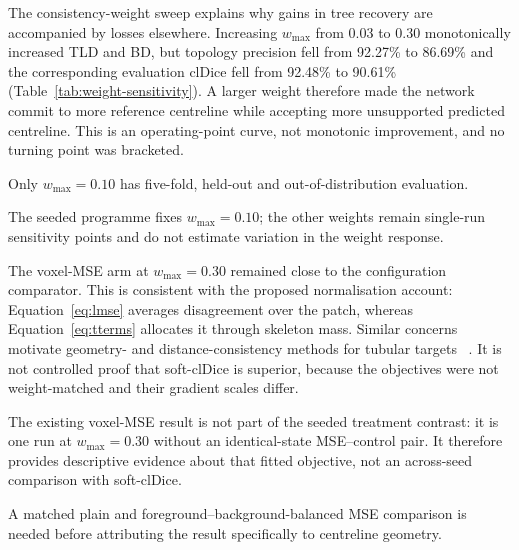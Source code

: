The consistency-weight sweep explains why gains in tree recovery are accompanied by losses
elsewhere. Increasing $w_{\max}$ from 0.03 to 0.30 monotonically increased TLD and BD, but topology
precision fell from 92.27\% to 86.69\% and the corresponding evaluation clDice fell from 92.48\%
to 90.61\% (Table~\ref{tab:weight-sensitivity}). A larger weight therefore made the network commit
to more reference centreline while accepting more unsupported predicted centreline. This is an
operating-point curve, not monotonic improvement, and no turning point was bracketed.

\ifshowcurrentcontrol
\begin{currentcontrolroute}
Only $w_{\max}=0.10$ has five-fold, held-out and out-of-distribution evaluation.
\end{currentcontrolroute}
\fi

\ifshowpairedcontrol
\begin{pairedcontrolroute}
The seeded programme fixes $w_{\max}=0.10$; the other weights remain single-run sensitivity
points and do not estimate variation in the weight response.
\end{pairedcontrolroute}
\fi

\ifshowcurrentcontrol
\begin{currentcontrolroute}
The voxel-MSE arm at $w_{\max}=0.30$ remained close to the configuration comparator. This is
consistent with the proposed normalisation account: Equation~\eqref{eq:lmse} averages disagreement
over the patch, whereas Equation~\eqref{eq:tterms} allocates it through skeleton mass. Similar
concerns motivate geometry- and distance-consistency methods for tubular targets
~\cite{gu2023featurespecialisation,zhu2024crossgeometry,zhao2025vesselselftraining}. It is not
controlled proof that soft-clDice is superior, because the objectives were not weight-matched and
their gradient scales differ.
\end{currentcontrolroute}
\fi

\ifshowpairedcontrol
\begin{pairedcontrolroute}
The existing voxel-MSE result is not part of the seeded treatment contrast: it is one run at
$w_{\max}=0.30$ without an identical-state MSE--control pair. It therefore provides descriptive
evidence about that fitted objective, not an across-seed comparison with soft-clDice.
\end{pairedcontrolroute}
\fi

A matched plain and foreground--background-balanced MSE comparison is needed before attributing
the result specifically to centreline geometry.

